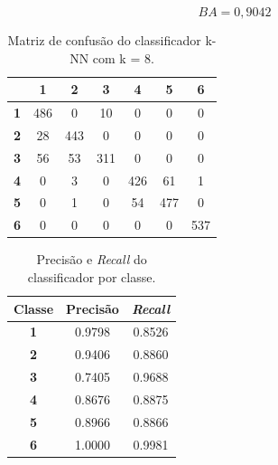 \begin{equation}\label{eq:ba_lr_1000}
BA = 0,9042
\end{equation}

\begin{table}[H]
\centering
\begin{tabular}{c||c|c|c|c|c|c|}
	\cline{2-7}
	& \textbf{1} & \textbf{2} & \textbf{3} & \textbf{4} & \textbf{5} & \textbf{6} \\ \hline\hline
	\multicolumn{1}{|c||}{\textbf{1}} & 486        & 0          & 10         & 0          & 0          & 0          \\ \hline
	\multicolumn{1}{|c||}{\textbf{2}} & 28         & 443        & 0          & 0          & 0          & 0          \\ \hline
	\multicolumn{1}{|c||}{\textbf{3}} & 56         & 53         & 311        & 0          & 0          & 0          \\ \hline
	\multicolumn{1}{|c||}{\textbf{4}} & 0          & 3          & 0          & 426        & 61         & 1          \\ \hline
	\multicolumn{1}{|c||}{\textbf{5}} & 0          & 1          & 0          & 54         & 477        & 0          \\ \hline
	\multicolumn{1}{|c||}{\textbf{6}} & 0          & 0          & 0          & 0          & 0          & 537        \\ \hline
\end{tabular}
\caption{Matriz de confusão do classificador k-NN com k = 8.}
\label{tab:mc_lr_1000}
\end{table}

\begin{table}[H]
\centering
\begin{tabular}{c|c|c}
	\textbf{Classe} & \textbf{Precisão} & \textit{\textbf{Recall}} \\ \hline
	\textbf{1}      & 0.9798            & 0.8526                   \\
	\textbf{2}      & 0.9406            & 0.8860                   \\
	\textbf{3}      & 0.7405            & 0.9688                   \\
	\textbf{4}      & 0.8676            & 0.8875                   \\
	\textbf{5}      & 0.8966            & 0.8866                   \\
	\textbf{6}      & 1.0000            & 0.9981                  
\end{tabular}
\caption{Precisão e \textit{Recall} do classificador por classe.}
\label{tab:pr_lr_1000}
\end{table}







